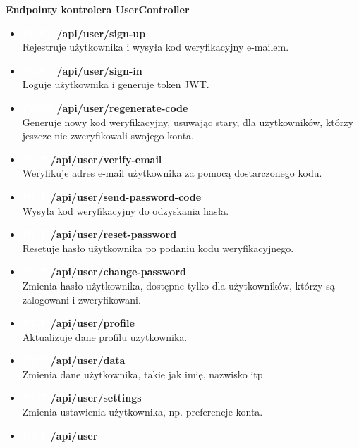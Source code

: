 \documentclass[12pt,a4paper]{article}
\begin{document}
\noindent \textbf{Endpointy kontrolera UserController}
\begin{itemize} 
    \item \textbf{\colorbox{green!90}{\textcolor{white}{POST}} /api/user/sign-up} \\
    Rejestruje użytkownika i wysyła kod weryfikacyjny e-mailem. 
    \item \textbf{\colorbox{green!90}{\textcolor{white}{POST}} /api/user/sign-in} \\
    Loguje użytkownika i generuje token JWT. 
    \item \textbf{\colorbox{green!90}{\textcolor{white}{POST}} /api/user/regenerate-code} \\
    Generuje nowy kod weryfikacyjny, usuwając stary, dla użytkowników, którzy jeszcze nie zweryfikowali swojego konta. 
    \item \textbf{\colorbox{orange!90}{\textcolor{white}{PUT}} /api/user/verify-email} \\
    Weryfikuje adres e-mail użytkownika za pomocą dostarczonego kodu. 
    \item \textbf{\colorbox{orange!90}{\textcolor{white}{PUT}} /api/user/send-password-code} \\
    Wysyła kod weryfikacyjny do odzyskania hasła. 
    \item \textbf{\colorbox{orange!90}{\textcolor{white}{PUT}} /api/user/reset-password} \\
    Resetuje hasło użytkownika po podaniu kodu weryfikacyjnego. 
    \item \textbf{\colorbox{orange!90}{\textcolor{white}{PUT}} /api/user/change-password} \\
    Zmienia hasło użytkownika, dostępne tylko dla użytkowników, którzy są zalogowani i zweryfikowani. 
    \item \textbf{\colorbox{orange!90}{\textcolor{white}{PUT}} /api/user/profile} \\
    Aktualizuje dane profilu użytkownika. 
    \item \textbf{\colorbox{orange!90}{\textcolor{white}{PUT}} /api/user/data} \\
    Zmienia dane użytkownika, takie jak imię, nazwisko itp. 
    \item \textbf{\colorbox{orange!90}{\textcolor{white}{PUT}} /api/user/settings} \\
    Zmienia ustawienia użytkownika, np. preferencje konta. 
    \item \textbf{\colorbox{cyan!90}{\textcolor{white}{GET}} /api/user} \\

\end{itemize}
\end{document}
